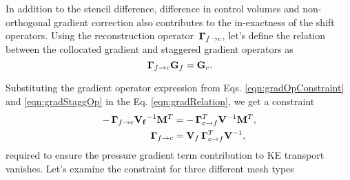In addition to the stencil difference, difference in control volumes and non-orthogonal gradient correction also contributes to the in-exactness of the shift operators. Using the reconstruction operator $\, \mathbf{\Gamma}_{f \rightarrow c}$, let's define the relation between the collocated gradient and staggered gradient operators as
\begin{equation}
\, \mathbf{\Gamma}_{f \rightarrow c} {\mathbf{G}_f} = {\mathbf{G}_c}.
\label{eqn:gradRelation}
\end{equation}

Substituting the gradient operator expression from Eqs. \eqref{eqn:gradOpConstraint} and \eqref{eqn:gradStaggOp} in the Eq. \eqref{eqn:gradRelation}, we get a constraint
\begin{align}
\begin{split}
- \, \mathbf{\Gamma}_{f \rightarrow c} \mathbf{V_f}^{-1} \mathbf{M}^T &= - \, \mathbf{\Gamma}_{c \rightarrow f}^T \mathbf{V}^{-1} \mathbf{M}^T,
\\
\, \mathbf{\Gamma}_{f \rightarrow c} &= {\mathbf{V}_f} \, \mathbf{\Gamma}_{c \rightarrow f}^T \mathbf{V}^{-1},
\end{split}
\label{eqn:shiftOpConstraint}
\end{align}
required to ensure the pressure gradient term contribution to KE transport vanishes. Let's examine the constraint for three different mesh types

